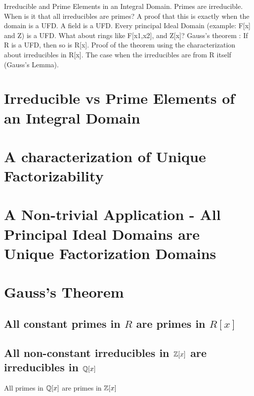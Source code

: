
\noindent
Irreducible and Prime Elements in an Integral Domain. Primes are irreducible. When is it that all irreducibles are primes? A proof that this is exactly when the domain is a UFD.
A field is a UFD. Every principal Ideal Domain (example: F[x] and Z) is a UFD.
What about rings like F[x1,x2], and Z[x]?
Gauss's theorem : If R is a UFD, then so is R[x].
Proof of the theorem using the characterization about irreducibles in R[x]. The case when the irreducibles are from R itself (Gauss's Lemma).

\section{Irreducible vs Prime Elements of an Integral Domain}

\section{A characterization of Unique Factorizability}

\section{A Non-trivial Application - All Principal Ideal Domains are Unique Factorization Domains}

\section{Gauss's Theorem}
\subsection{All constant primes in $R$ are primes in $R[x]$}
\subsection{All non-constant irreducibles in ${\mathbb{Z}}[x]$ are irreducibles in ${\mathbb{Q}}[x]$}
All primes in ${\mathbb{Q}}[x]$ are primes in ${\mathbb{Z}}[x]$